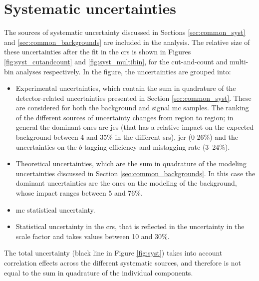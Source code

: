 \section{Systematic uncertainties}
\label{sec:strong:syst}

The sources of systematic uncertainty discussed in Sections \ref{sec:common_syst} and \ref{sec:common_backgrounds} are included in the analysis.
The relative size of these uncertainties after the fit in the \glspl{cr} is shown in Figures \ref{fig:syst_cutandcount} and \ref{fig:syst_multibin},
for the cut-and-count and multi-bin analyses respectively. 
In the figure, the uncertainties are grouped into:
\begin{itemize}
\item Experimental uncertainties, which contain the sum in quadrature of the detector-related uncertainties 
presented in Section \ref{sec:common_syst}. These are considered for both the background and signal \gls{mc} samples.
The ranking of the different sources of uncertainty changes from region to region; in general the dominant ones are \gls{jes} (that has a 
relative impact on the expected background between 4 and 35\% in the different \glspl{sr}), \gls{jer} (0-26\%) and the uncertainties on the 
$b$-tagging efficiency and mistagging rate (3--24\%).

\item Theoretical uncertainties, which are the sum in quadrature of the modeling uncertainties discussed in Section \ref{sec:common_backgrounds}.
In this case the dominant uncertainties are the ones on the modeling of the \ttbar background, whose impact ranges between 5 and 76\%.

\item \gls{mc} statistical uncertainty.

\item Statistical uncertainty in the \glspl{cr}, that is reflected in the uncertainty in the \ttbar scale factor and takes values between 10 and 30\%.

\end{itemize}

The total uncertainty (black line in Figure \ref{fig:syst}) takes into account correlation effects across the different systematic sources, 
and therefore is not equal to the sum in quadrature of the individual components. 

